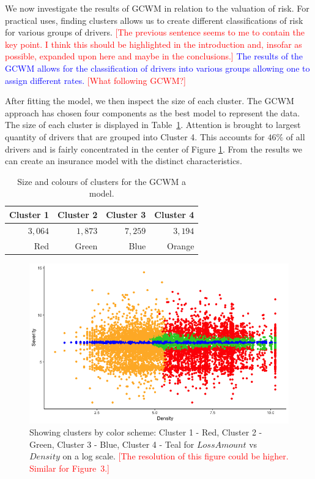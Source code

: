 \documentclass[11pt,letterpaper]{article}
\numberwithin{equation}{section}
\numberwithin{equation}{section}
\numberwithin{equation}{section}
\begin{document}
	We now investigate the results of GCWM in relation to the valuation of risk. For practical uses, finding clusters allows us to create different classifications of risk for various groups of drivers. \textcolor{red}{[The previous sentence seems to me to contain the key point. I think this should be highlighted in the introduction and, insofar as possible, expanded upon here and maybe in the conclusions.]} \textcolor{blue}{The results of the GCWM allows for the classification of drivers into various groups allowing one to assign different rates. } \textcolor{red}{[What following GCWM?]}

After fitting the model, we then inspect the size of each cluster. The GCWM approach has chosen four components as the best model to represent the data. The size of each cluster is displayed in Table~\ref{table:sizeSev}. Attention is brought to largest quantity of drivers that are grouped into Cluster 4. This accounts for $ 46 \% $ of all drivers and is fairly concentrated in the center of Figure \ref{fig:vet1a}. From the results we can create an insurance model with the distinct characteristics.
\begin{table}[!htb]
\centering
\caption{Size and colours of clusters for the GCWM a model.}
\label{table:sizeSev}
\begin{tabular}{rrrr}
\hline
Cluster 1   & Cluster 2  & Cluster 3   & Cluster 4    \\
\hline
$3,064$ & $1,873$  &$ 7,259$ & $3,194$ \\
Red & Green & Blue & Orange \\

\hline
\end{tabular}
\end{table}
\begin{figure}[!htb]
\begin{center}
\includegraphics[scale=0.40]{sevClusterPlot.png}
\end{center}
\vspace{-0.2in}
\caption{Showing clusters by color scheme: Cluster 1 - Red, Cluster 2 - Green, Cluster 3 - Blue, Cluster 4 - Teal for $LossAmount$ vs $Density$ on a log scale. \textcolor{red}{[The resolution of this figure could be higher. Similar for Figure~3.]}}
\label{fig:vet1a}
\end{figure}
\end{document}
